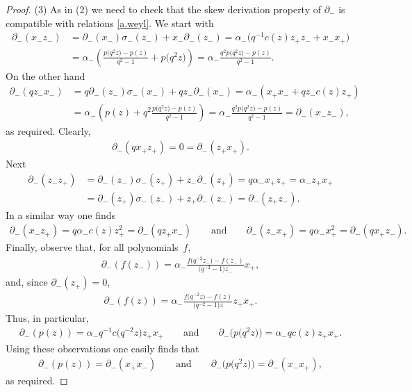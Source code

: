 \documentclass[10pt,a4paper]{amsart}
\numberwithin{equation}{section}
\begin{document}
\begin{proof}
(3) As in (2) we need to check that the skew derivation property of $\partial_-$ is compatible with relations \eqref{a.weyl}. We start with
\begin{align*}
\partial_-(x_-z_-) &= \partial_-(x_-)\sigma_-(z_-) + x_- \partial_-(z_-) = \alpha_-\big(q^{-1}c(z)z_+z_- +x_-x_+\big)\\
&= \alpha_-\left(\frac{p\big(q^2z\big) -p(z)}{q^2 -1} +p\big(q^2z\big)\right)= \alpha_-\frac{q^2p\big(q^2z\big) -p(z)}{q^2 -1}.
\end{align*}
On the other hand
\begin{align*}
\partial_-(qz_-x_-) &= q \partial_-(z_-)\sigma_-(x_-) + qz_- \partial_-(x_-) = \alpha_-(x_+x_- + qz_-c(z)z_+)\\
&= \alpha_-\left(p(z) + q^2\frac{p\big(q^2z\big) -p(z)}{q^2 -1} \right) = \alpha_-\frac{q^2p\big(q^2z\big) -p(z)}{q^2 -1} = \partial_-(x_-z_-),
\end{align*}
as required. Clearly,
\begin{gather*}
\partial_-(qx_+z_+) = 0 = \partial_-(z_+x_+).
\end{gather*}
 Next
\begin{align*}
\partial_-(z_-z_+) &= \partial_-(z_-)\sigma_-(z_+) + z_- \partial_-(z_+) = q\alpha_-x_+z_+ = \alpha_-z_+x_+\\
& = \partial_-(z_+)\sigma_-(z_-) + z_+ \partial_-(z_-) = \partial_-(z_+z_-).
\end{align*}
In a similar way one f\/inds
\begin{gather*}
\partial_-(x_-z_+) = q\alpha_-c(z) z_+^2 = \partial_-(qz_+x_-) \qquad \mbox{and} \qquad \partial_-(z_-x_+) = q\alpha_- x_+^2 = \partial_-(qx_+z_-) .
\end{gather*}
Finally, observe that, for all polynomials~$f$,
\begin{gather*}%
\partial_-(f(z_-)) = \alpha_-\frac{f\big(q^{-2}z_-\big) -f(z_-)}{\big(q^{-2} -1\big)z_-}x_+,
\end{gather*}
and, since $\partial_-(z_+) =0$,
\begin{gather*}%
\partial_-(f(z)) = \alpha_-\frac{f\big(q^{-2}z\big) -f(z)}{\big(q^{-2} -1\big)z}z_+x_+.
\end{gather*}
Thus, in particular,
\begin{gather*}
\partial_-(p(z)) = \alpha_- q^{-1}c\big(q^{-2}z\big)z_+x_+ \qquad \mbox{and} \qquad \partial_-\big(p\big(q^2z\big)\big) = \alpha_- q c(z)z_+x_+.
\end{gather*}
Using these observations one easily f\/inds that
\begin{gather*}
\partial_-(p(z)) = \partial_-(x_+x_-) \qquad \mbox{and} \qquad \partial_-\big(p\big(q^2z\big)\big) = \partial_-(x_-x_+),
\end{gather*}
as required.


\end{proof}
\end{document}
